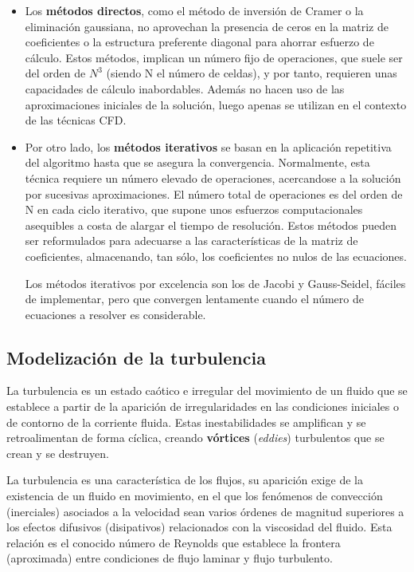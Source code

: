 \begin{itemize}
\item
  Los \textbf{métodos directos}, como el método de inversión de Cramer o
  la eliminación gaussiana, no aprovechan la presencia de ceros en la
  matriz de coeficientes o la estructura preferente diagonal para
  ahorrar esfuerzo de cálculo. Estos métodos, implican un número fijo de
  operaciones, que suele ser del orden de \(N^3\) (siendo N el número de
  celdas), y por tanto, requieren unas capacidades de cálculo
  inabordables. Además no hacen uso de las aproximaciones iniciales de
  la solución, luego apenas se utilizan en el contexto de las técnicas
  CFD.
\item
  Por otro lado, los \textbf{métodos iterativos} se basan en la
  aplicación repetitiva del algoritmo hasta que se asegura la
  convergencia. Normalmente, esta técnica requiere un número elevado de
  operaciones, acercandose a la solución por sucesivas aproximaciones.
  El número total de operaciones es del orden de N en cada ciclo
  iterativo, que supone unos esfuerzos computacionales asequibles a
  costa de alargar el tiempo de resolución. Estos métodos pueden ser
  reformulados para adecuarse a las características de la matriz de
  coeficientes, almacenando, tan sólo, los coeficientes no nulos de las
  ecuaciones.

  Los métodos iterativos por excelencia son los de Jacobi y
  Gauss-Seidel, fáciles de implementar, pero que convergen lentamente
  cuando el número de ecuaciones a resolver es considerable.
\end{itemize}

\subsection{Modelización de la turbulencia}\label{header-n454}

La turbulencia es un estado caótico e irregular del movimiento de un
fluido que se establece a partir de la aparición de irregularidades en
las condiciones iniciales o de contorno de la corriente fluida. Estas
inestabilidades se amplifican y se retroalimentan de forma cíclica,
creando \textbf{vórtices} (\emph{eddies}) turbulentos que se crean y se
destruyen.

La turbulencia es una característica de los flujos, su aparición exige
de la existencia de un fluido en movimiento, en el que los fenómenos de
convección (inerciales) asociados a la velocidad sean varios órdenes de
magnitud superiores a los efectos difusivos (disipativos) relacionados
con la viscosidad del fluido. Esta relación es el conocido número de
Reynolds que establece la frontera (aproximada) entre condiciones de
flujo laminar y flujo turbulento.

